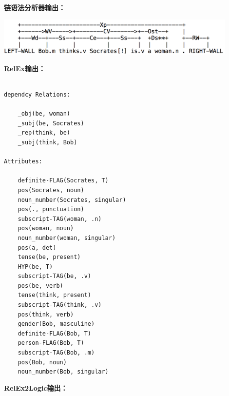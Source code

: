 {\bf 链语法分析器输出：}

\includegraphics[width=12cm]{figures/Socrates_5.png}

{\bf RelEx输出：}

\begin{verbatim}

dependcy Relations:

    _obj(be, woman)
    _subj(be, Socrates)
    _rep(think, be)
    _subj(think, Bob)

Attributes:

    definite-FLAG(Socrates, T)
    pos(Socrates, noun)
    noun_number(Socrates, singular)
    pos(., punctuation)
    subscript-TAG(woman, .n)
    pos(woman, noun)
    noun_number(woman, singular)
    pos(a, det)
    tense(be, present)
    HYP(be, T)
    subscript-TAG(be, .v)
    pos(be, verb)
    tense(think, present)
    subscript-TAG(think, .v)
    pos(think, verb)
    gender(Bob, masculine)
    definite-FLAG(Bob, T)
    person-FLAG(Bob, T)
    subscript-TAG(Bob, .m)
    pos(Bob, noun)
    noun_number(Bob, singular)

\end{verbatim}

{\bf RelEx2Logic输出：}


